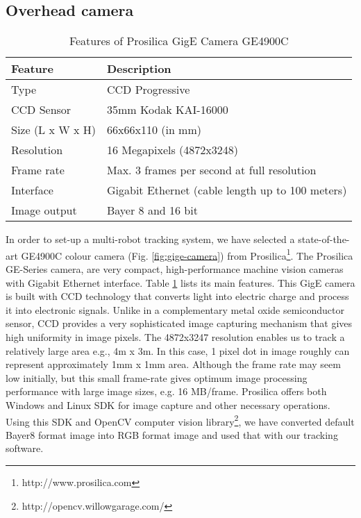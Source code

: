\subsection{Overhead camera}
\begin{table}
\caption{Features of Prosilica GigE Camera GE4900C}
\label{table:ge4900c}
\begin{center}
\begin{tabular}{|l||l|}
\hline \textbf{Feature} & \textbf{Description}\\
\hline Type & CCD Progressive\\
\hline CCD Sensor & 35mm Kodak KAI-16000\\
\hline Size (L x W x H) & 66x66x110 (in mm)\\
\hline Resolution & 16 Megapixels (4872x3248)\\ 
\hline Frame rate & Max. 3 frames per second at full resolution\\
\hline Interface & Gigabit Ethernet (cable length up to 100 meters)\\
\hline Image output & Bayer 8 and 16 bit\\
\hline
\end{tabular}
\end{center}
\end{table}
In order to set-up a multi-robot tracking system, we have selected a state-of-the-art GE4900C colour camera (Fig. \ref{fig:gige-camera}) from Prosilica\footnote{http://www.prosilica.com}. The Prosilica GE-Series camera, are very compact, high-performance machine vision cameras with Gigabit Ethernet interface.  Table \ref{table:ge4900c} lists its main features. This GigE camera is built with \acf{CCD} technology that converts light into electric charge and process it into electronic signals. Unlike in a complementary metal oxide semiconductor sensor, CCD provides a very sophisticated image capturing mechanism that gives high uniformity in image pixels. The 4872x3247 resolution enables us to track a relatively large area e.g., 4m x 3m. In this case, 1 pixel dot in image roughly can represent approximately 1mm x 1mm area. Although the frame rate may seem low initially, but this small frame-rate gives optimum image processing performance with large image sizes, e.g. 16 MB/frame. Prosilica offers both Windows and Linux \acf{SDK} for image capture and other necessary operations. Using this SDK and OpenCV computer vision library\footnote{http://opencv.willowgarage.com/}, we have converted default Bayer8 format image into RGB format image and used that with our tracking software.
